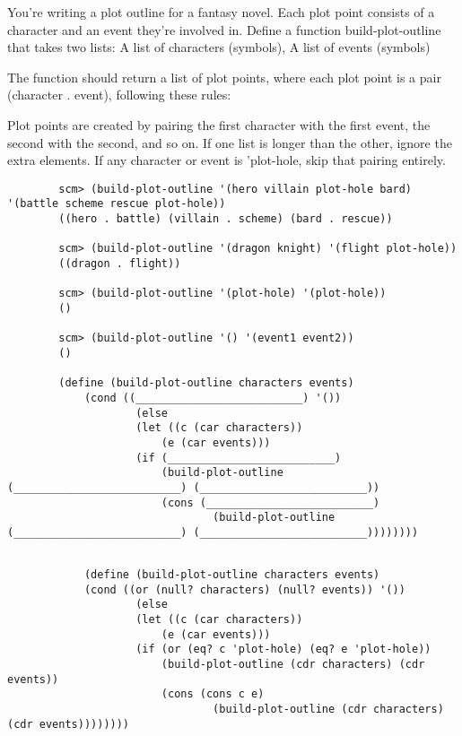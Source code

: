 \begin{blocksection}
\question 
    You're writing a plot outline for a fantasy novel. Each plot point 
    consists of a character and an event they’re involved in.
    Define a function build-plot-outline that takes two lists: 
        A list of characters (symbols), A list of events (symbols)

    The function should return a list of plot points, where each plot point 
    is a pair (character . event), following these rules:

    Plot points are created by pairing the first character with the first event, the second with the second, and so on.
    If one list is longer than the other, ignore the extra elements.
    If any character or event is 'plot-hole, skip that pairing entirely.
    
    \begin{lstlisting}
        scm> (build-plot-outline '(hero villain plot-hole bard) '(battle scheme rescue plot-hole))
        ((hero . battle) (villain . scheme) (bard . rescue))

        scm> (build-plot-outline '(dragon knight) '(flight plot-hole))
        ((dragon . flight))

        scm> (build-plot-outline '(plot-hole) '(plot-hole))
        ()

        scm> (build-plot-outline '() '(event1 event2))
        ()
        
        (define (build-plot-outline characters events)
            (cond ((__________________________) '())
                    (else
                    (let ((c (car characters))
                        (e (car events)))
                    (if (__________________________)
                        (build-plot-outline (__________________________) (__________________________))
                        (cons (__________________________)
                                (build-plot-outline (__________________________) (__________________________))))))))

    \end{lstlisting}

    \begin{solution}[1in]
        \begin{lstlisting}
            
            (define (build-plot-outline characters events)
            (cond ((or (null? characters) (null? events)) '())
                    (else
                    (let ((c (car characters))
                        (e (car events)))
                    (if (or (eq? c 'plot-hole) (eq? e 'plot-hole))
                        (build-plot-outline (cdr characters) (cdr events))
                        (cons (cons c e)
                                (build-plot-outline (cdr characters) (cdr events))))))))

        \end{lstlisting}
    \end{solution}
    
\end{blocksection}